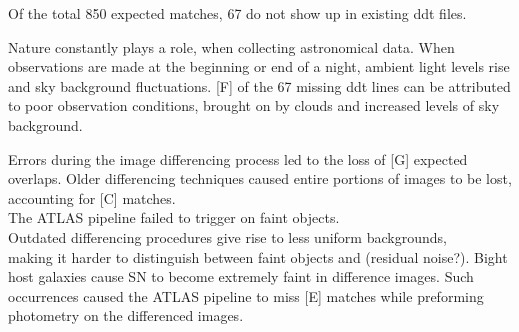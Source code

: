 \documentclass[aps,prb,twocolumn,superscriptaddress]{revtex4-1}
\begin{document}
Of the total 850 expected matches, 67 do not show up in existing ddt files. 

Nature constantly plays a role, when collecting astronomical data. When 
observations are made at the beginning or end of a night, ambient light 
levels rise and sky background fluctuations. [F] of the 67 missing ddt 
lines can be attributed to poor observation conditions, brought on by 
clouds and increased levels of sky background.

Errors during the image differencing process led to the loss of [G] 
expected overlaps. Older differencing techniques caused entire portions 
of images to be lost, accounting for [C] matches. \\

The ATLAS pipeline failed to trigger on faint objects. \\
Outdated differencing procedures give rise to less uniform backgrounds, \\
making it harder to distinguish between faint objects and (residual noise?). 
Bight host galaxies cause SN to become extremely faint in difference images.
Such occurrences caused the ATLAS pipeline to miss [E] matches while preforming 
photometry on the differenced images.
\end{document}
